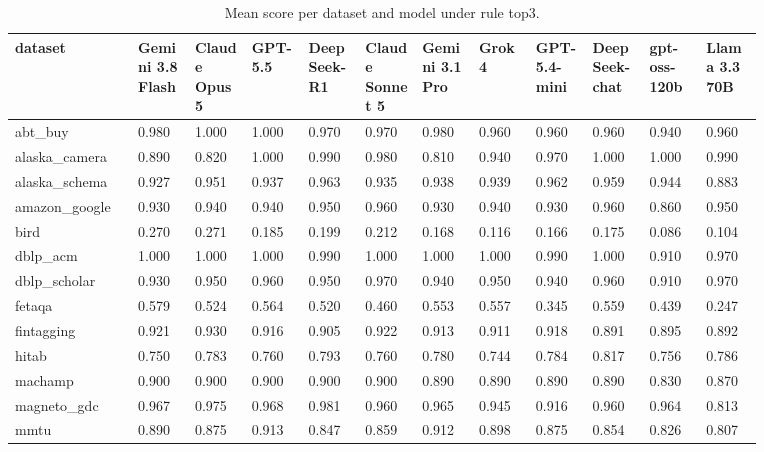 \begin{landscape}
\tiny
\setlength{\tabcolsep}{3pt}
\begin{longtable}{p{0.134\linewidth}p{0.067\linewidth}p{0.067\linewidth}p{0.067\linewidth}p{0.067\linewidth}p{0.067\linewidth}p{0.067\linewidth}p{0.067\linewidth}p{0.067\linewidth}p{0.067\linewidth}p{0.067\linewidth}p{0.067\linewidth}}
\caption{Mean score per dataset and model under rule top3.}\label{tab:per_dataset_mean_top3}\\
\toprule
dataset & Gemini 3.8 Flash & Claude Opus 5 & GPT-5.5 & DeepSeek-R1 & Claude Sonnet 5 & Gemini 3.1 Pro & Grok 4 & GPT-5.4-mini & DeepSeek-chat & gpt-oss-120b & Llama 3.3 70B \\
\midrule
abt\_\allowbreak{}buy & 0.980 & 1.000 & 1.000 & 0.970 & 0.970 & 0.980 & 0.960 & 0.960 & 0.960 & 0.940 & 0.960 \\
alaska\_\allowbreak{}camera & 0.890 & 0.820 & 1.000 & 0.990 & 0.980 & 0.810 & 0.940 & 0.970 & 1.000 & 1.000 & 0.990 \\
alaska\_\allowbreak{}schema & 0.927 & 0.951 & 0.937 & 0.963 & 0.935 & 0.938 & 0.939 & 0.962 & 0.959 & 0.944 & 0.883 \\
amazon\_\allowbreak{}google & 0.930 & 0.940 & 0.940 & 0.950 & 0.960 & 0.930 & 0.940 & 0.930 & 0.960 & 0.860 & 0.950 \\
bird & 0.270 & 0.271 & 0.185 & 0.199 & 0.212 & 0.168 & 0.116 & 0.166 & 0.175 & 0.086 & 0.104 \\
dblp\_\allowbreak{}acm & 1.000 & 1.000 & 1.000 & 0.990 & 1.000 & 1.000 & 1.000 & 0.990 & 1.000 & 0.910 & 0.970 \\
dblp\_\allowbreak{}scholar & 0.930 & 0.950 & 0.960 & 0.950 & 0.970 & 0.940 & 0.950 & 0.940 & 0.960 & 0.910 & 0.970 \\
fetaqa & 0.579 & 0.524 & 0.564 & 0.520 & 0.460 & 0.553 & 0.557 & 0.345 & 0.559 & 0.439 & 0.247 \\
fintagging & 0.921 & 0.930 & 0.916 & 0.905 & 0.922 & 0.913 & 0.911 & 0.918 & 0.891 & 0.895 & 0.892 \\
hitab & 0.750 & 0.783 & 0.760 & 0.793 & 0.760 & 0.780 & 0.744 & 0.784 & 0.817 & 0.756 & 0.786 \\
machamp & 0.900 & 0.900 & 0.900 & 0.900 & 0.900 & 0.890 & 0.890 & 0.890 & 0.890 & 0.830 & 0.870 \\
magneto\_\allowbreak{}gdc & 0.967 & 0.975 & 0.968 & 0.981 & 0.960 & 0.965 & 0.945 & 0.916 & 0.960 & 0.964 & 0.813 \\
mmtu & 0.890 & 0.875 & 0.913 & 0.847 & 0.859 & 0.912 & 0.898 & 0.875 & 0.854 & 0.826 & 0.807 \\

\end{longtable}
\end{landscape}

